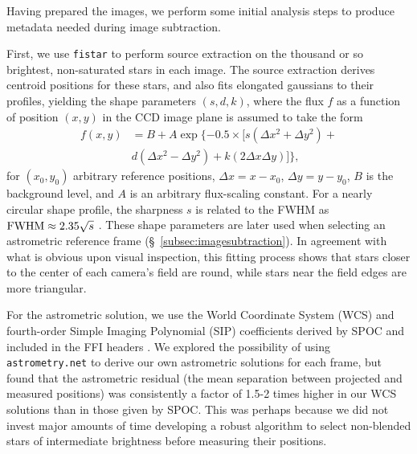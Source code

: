 \documentclass[12pt,twocolumn,tighten]{aastex62}
\begin{document}
Having prepared the images, we perform some initial analysis steps to
produce metadata needed during image subtraction.  

First, we use \texttt{fistar} to perform source extraction on the
thousand or so brightest, non-saturated stars in each image.  The
source extraction derives centroid positions for these stars, and also
fits elongated gaussians to their profiles, yielding the shape
parameters $(s,d,k)$, where the flux $f$ as a function of position
$(x,y)$ in the CCD image plane is assumed to take the form
\begin{align}
  f(x,y) &= B + A \exp \{ -0.5 \times [
    s(\Delta x^2 + \Delta y^2) + \\
    \nonumber
    &d(\Delta x^2 - \Delta y^2) +
    k(2\Delta x \Delta y)
  ]  \},
\end{align}
for $(x_0,y_0)$ arbitrary reference positions,
$\Delta x = x-x_0$, $\Delta y = y - y_0$, $B$ is the background
level, and $A$ is an arbitrary
flux-scaling constant.
For a nearly circular shape profile, the sharpness $s$ is related to
the FWHM as ${\rm FWHM} \approx 2.35\sqrt{s}$ \citep[{\it
e.g.},][]{Pal_2009}.  These shape parameters are later used when
selecting an astrometric reference frame
(\S~\ref{subsec:imagesubtraction}).  
In agreement with what is obvious upon visual inspection, this 
fitting process shows that stars closer to the
center of each camera's field are round, while
stars near the field edges are more triangular.

For the astrometric solution, we use the World Coordinate System (WCS)
and fourth-order Simple Imaging Polynomial (SIP) coefficients
derived by SPOC and included in the FFI headers
\citep[][Sec.~8]{pence_fits_2010}.  We explored the possibility of
using \texttt{astrometry.net} \citep{lang_2010} to derive our own
astrometric solutions for each frame, but found that the astrometric
residual (the mean separation between projected and measured
positions) was consistently a factor of 1.5-2 times higher in our WCS
solutions than in those given by SPOC.  This was perhaps because
we did not invest major amounts of time developing a robust
algorithm to select non-blended stars of intermediate brightness before
measuring their positions.
\end{document}
